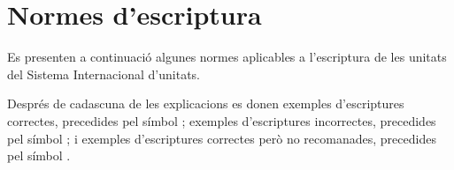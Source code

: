 \section{Normes d'escriptura}\label{sec:normes-escript}

Es presenten a continuació algunes normes aplicables a l'escriptura
de les unitats del Sistema Internacional d'unitats.

Després de cadascuna de les explicacions es donen exemples d'escriptures correctes, precedides pel símbol \textcolor{Green}\faCheckSquare{}; exemples d'escriptures  incorrectes,  precedides pel símbol \textcolor{Red}\faTimesCircle{}; i exemples d'escriptures correctes però no recomanades, precedides pel símbol
\textcolor{Blue}\faExclamationTriangle{}.

